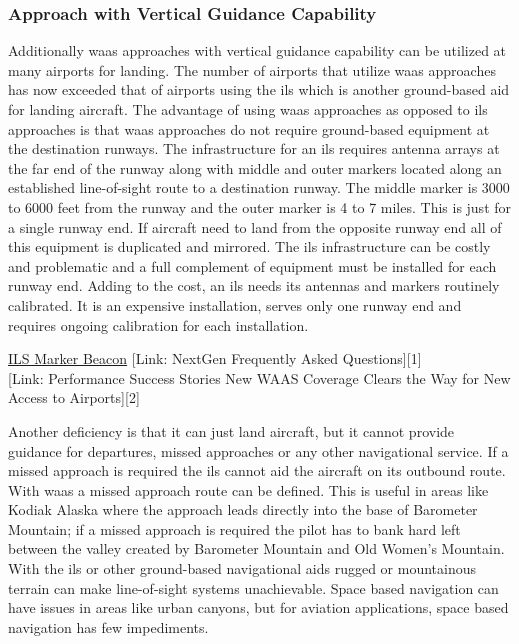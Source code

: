 \subsubsection{Approach with Vertical Guidance
Capability}\label{approach-with-vertical-guidance-capability}

Additionally \ac{waas} approaches with
vertical guidance capability can be utilized at many airports for
landing. The number of airports that utilize \ac{waas} approaches has now exceeded that of airports using the
\ac{ils} which is another ground-based aid for landing
aircraft. The advantage of using \ac{waas} approaches as opposed to
\ac{ils} approaches is that \ac{waas} approaches do
not require ground-based equipment at the destination runways. The
infrastructure for an \ac{ils} requires antenna
arrays at the far end of the runway along with middle and outer markers
located along an established line-of-sight route to a destination
runway. The middle marker is 3000 to 6000 feet from the runway and the
outer marker is 4 to 7 miles. This is just for a single runway end. If
aircraft need to land from the opposite runway end all of this equipment
is duplicated and mirrored. The \ac{ils} infrastructure can be costly and
problematic and a full complement of equipment must be installed for
each runway end. Adding to the cost, an \ac{ils} needs its antennas and
markers routinely calibrated. It is an expensive installation, serves
only one runway end and requires ongoing calibration for each
installation.

\href{https://en.wikipedia.org/wiki/Marker_beacon}{ILS Marker Beacon}
{[}Link: NextGen Frequently Asked Questions{]}{[}1{]}\\
{[}Link: Performance Success Stories New WAAS Coverage Clears the Way
for New Access to Airports{]}{[}2{]}

Another deficiency is that it can just land aircraft, but it cannot
provide guidance for departures, missed approaches or any other
navigational service. If a missed approach is required the \ac{ils} cannot aid the aircraft on its outbound route. With
\ac{waas} a missed approach route can be defined. This is useful in areas
like Kodiak Alaska where the approach leads directly into the base of
Barometer Mountain; if a missed approach is required the pilot has to
bank hard left between the valley created by Barometer Mountain and Old
Women's Mountain. With the \ac{ils} or other
ground-based navigational aids rugged or mountainous terrain can make
line-of-sight systems unachievable. Space based navigation can have
issues in areas like urban canyons, but for aviation applications, space
based navigation has few impediments.

